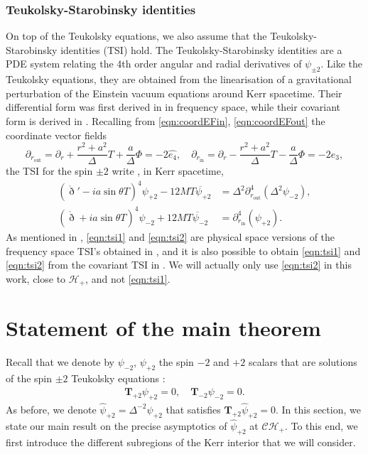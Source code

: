 \documentclass[reqno]{amsart}
\numberwithin{equation}{section}
\newcommand{\teukhat}{\widehat{\teuk}}
\newcommand{\mch}{\mathcal{H}}
\newcommand{\ch}{\mathcal{CH_+}}
\newcommand{\drond}{\mathring{\eth}}
\newcommand{\teuk}{\mathbf{T}}
\newcommand{\psihat}{\widehat{\psi}}
\newcommand{\eqhat}{\widehat{e_4}}
\newcommand{\psip}{\psi_{+2}}
\newcommand{\psim}{\psi_{-2}}
\newcommand{\psihatp}{\psihat_{+2}}
\theoremstyle{plain}
\theoremstyle{definition}
\theoremstyle{remark}
\numberwithin{equation}{section}
\begin{document}
\subsubsection{Teukolsky-Starobinsky identities}\label{section:tsi}
On top of the Teukolsky equations, we also assume that the Teukolsky-Starobinsky identities (TSI) hold. The Teukolsky-Starobinsky identities are a PDE system relating the 4th order angular and radial derivatives of $\psi_{\pm 2}$. Like the Teukolsky equations, they are obtained from the linearisation of a gravitational perturbation of the Einstein vacuum equations around Kerr spacetime. Their differential form was first derived in \cite{tsi1,tsi2} in frequency space, while their covariant form is derived in \cite{tsicovariant}. Recalling from \eqref{eqn:coordEFin}, \eqref{eqn:coordEFout} the coordinate vector fields 
$$\partial_{r_\mathrm{out}}=\partial_r+\frac{r^2+a^2}{\Delta}T+\frac{a}{\Delta}\Phi=-2\eqhat,\quad \partial_{r_\mathrm{in}}=\partial_r-\frac{r^2+a^2}{\Delta}T-\frac{a}{\Delta}\Phi=-2e_3,$$
the TSI for the spin $\pm 2$ write \cite[Lemma 3.21]{pricelaw}, in Kerr spacetime,
\begin{align}
    (\drond'-ia\sin\theta T)^4\psip-12M\overline{T\psip}&=\Delta^2\partial_{r_\mathrm{out}}^4(\Delta^2\psim),\label{eqn:tsi1}\\
    (\drond+ia\sin\theta T)^4\psim+12M\overline{T\psim}&=\partial_{r_\mathrm{in}}^4(\psip).\label{eqn:tsi2}
\end{align}
As mentioned in \cite{pricelaw}, \eqref{eqn:tsi1} and \eqref{eqn:tsi2} are physical space versions of the frequency space TSI's obtained in \cite{tsi1,tsi2}, and it is also possible to obtain \eqref{eqn:tsi1} and \eqref{eqn:tsi2} from the covariant TSI in \cite{tsicovariant}. We will actually only use \eqref{eqn:tsi2} in this work, close to $\mch_+$, and not \eqref{eqn:tsi1}.
\section{Statement of the main theorem}
\label{section:eq+assumptions}
Recall that we denote by $\psim$, $\psip$ the spin $-2$ and $+2$ scalars that are solutions of the spin $\pm2$ Teukolsky equations :
\begin{align}
    \teuk_{+2}\psip=0,\quad\teuk_{-2}\psim=0.
\end{align}
As before, we denote $\psihatp=\Delta^{-2}\psip$ that satisfies $\teukhat_{+2}\psihatp=0$. In this section, we state our main result on the precise asymptotics of $\psihatp$ at $\ch$. To this end, we first introduce the different subregions of the Kerr interior that we will consider.
\end{document}
